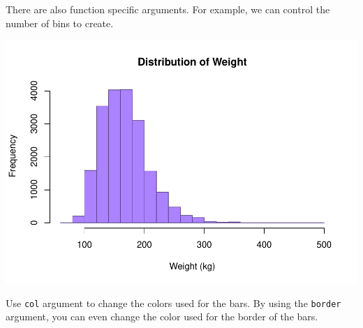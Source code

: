 \documentclass[
]{book}
\newenvironment{Shaded}{\begin{snugshade}}{\end{snugshade}}
\newcommand{\DataTypeTok}[1]{\textcolor[rgb]{0.13,0.29,0.53}{#1}}
\newcommand{\DecValTok}[1]{\textcolor[rgb]{0.00,0.00,0.81}{#1}}
\newcommand{\KeywordTok}[1]{\textcolor[rgb]{0.13,0.29,0.53}{\textbf{#1}}}
\newcommand{\NormalTok}[1]{#1}
\newcommand{\OperatorTok}[1]{\textcolor[rgb]{0.81,0.36,0.00}{\textbf{#1}}}
\newcommand{\StringTok}[1]{\textcolor[rgb]{0.31,0.60,0.02}{#1}}
\begin{document}
There are also function specific arguments. For example, we can control the number of bins to create.

\begin{Shaded}
\end{Shaded}

\includegraphics{_main_files/figure-latex/unnamed-chunk-129-1.pdf}

Use \texttt{col} argument to change the colors used for the bars. By using the \texttt{border} argument, you can even change the color used for the border of the bars.

\begin{Shaded}
\end{Shaded}
\end{document}
